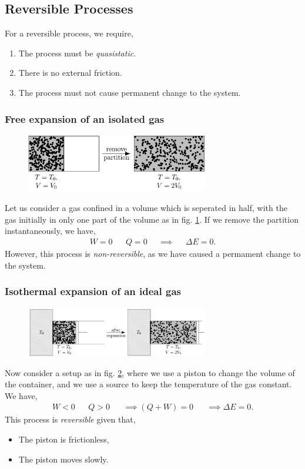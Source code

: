 \documentclass{book}
\begin{document}
\subsection{Reversible Processes}
For a reversible process, we require,
\begin{enumerate}
	\item The process must be \textit{quasistatic}.
	\item There is no external friction.
	\item The process must not cause permanent change to the system.
\end{enumerate}
\subsubsection{Free expansion of an isolated gas}
\begin{figure}
	\centering
	\includegraphics[width=300px]{FreeExpansion.png}
	\caption{} \label{fig:free expansion}
\end{figure}
Let us consider a gas confined in a volume which is seperated in half, with the gas initially in only one part of the volume as in fig. \ref{fig:free expansion}. If we remove the partition instantaneously, we have,
\begin{align}
	W = 0 && Q = 0 && \implies && \Delta E = 0.
\end{align}
However, this process is \textit{non-reversible}, as we have caused a permament change to the system.
\subsubsection{Isothermal expansion of an ideal gas}
\begin{figure}
	\centering
	\includegraphics[width=300px]{Isothermal.png}
	\caption{} \label{fig:isothermal}
\end{figure}
Now consider a setup as in fig. \ref{fig:isothermal}, where we use a piston to change the volume of the container, and we use a source to keep the temperature of the gas constant. We have,
\begin{align}
	W < 0 && Q > 0 && \implies (Q+W) = 0 && \implies \Delta E = 0.
\end{align}
This process is \textit{reversible} given that,
\begin{itemize}
	\item The piston is frictionless,
	\item The piston moves slowly.
\end{itemize}
\end{document}
